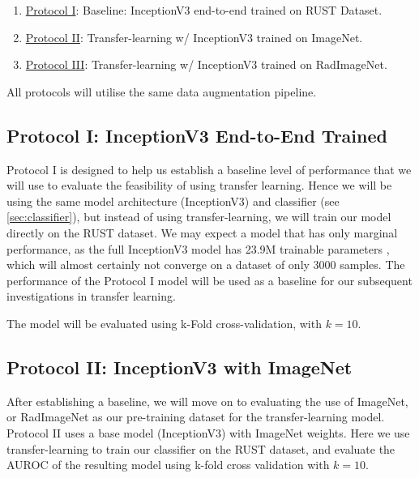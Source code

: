 \begin{enumerate}
    \item \hyperref[sec:protocol-i-method]{Protocol I}: Baseline: InceptionV3 end-to-end trained on RUST Dataset.
    \item \hyperref[sec:protocol-ii-method]{Protocol II}: Transfer-learning w/ InceptionV3 trained on ImageNet.
    \item \hyperref[sec:protocol-iii-method]{Protocol III}: Transfer-learning w/ InceptionV3 trained on RadImageNet.
\end{enumerate}

\noindent
All protocols will utilise the same data augmentation pipeline.



\subsection{Protocol I: InceptionV3 End-to-End Trained}\label{sec:protocol-i-method}

Protocol I is designed to help us establish a baseline level of performance that we will use to evaluate the feasibility of using transfer learning. Hence we will be using the same model architecture (InceptionV3) and classifier (see \autoref{sec:classifier}), but instead of using transfer-learning, we will train our model directly on the RUST dataset. We may expect a model that has only marginal performance, as the full InceptionV3 model has 23.9M trainable parameters \autocite{inceptionv3}, which will almost certainly not converge on a dataset of only 3000 samples. The performance of the Protocol I model will be used as a baseline for our subsequent investigations in transfer learning.

\noindent
The model will be evaluated using k-Fold cross-validation, with $k=10$.

\subsection{Protocol II: InceptionV3 with ImageNet}\label{sec:protocol-ii-method}

After establishing a baseline, we will move on to evaluating the use of ImageNet, or RadImageNet as our pre-training dataset for the transfer-learning model. Protocol II uses a base model (InceptionV3) with ImageNet weights. Here we use transfer-learning to train our classifier on the RUST dataset, and evaluate the AUROC of the resulting model using k-fold cross validation with \(k=10\).

